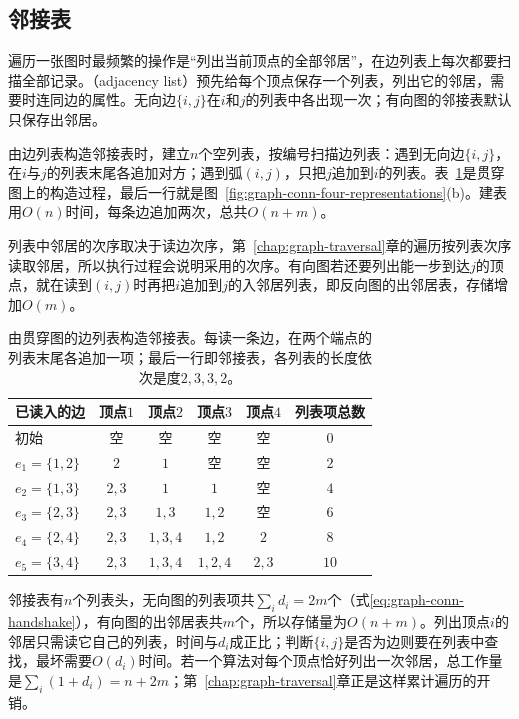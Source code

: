 \subsection{邻接表}
\label{sec:graph-conn-adjacency-list}

遍历一张图时最频繁的操作是“列出当前顶点的全部邻居”，在边列表上每次都要扫描全部记录。（adjacency list）预先给每个顶点保存一个列表，列出它的邻居，需要时连同边的属性。无向边$\{i,j\}$在$i$和$j$的列表中各出现一次；有向图的邻接表默认只保存出邻居。

由边列表构造邻接表时，建立$n$个空列表，按编号扫描边列表：遇到无向边$\{i,j\}$，在$i$与$j$的列表末尾各追加对方；遇到弧$(i,j)$，只把$j$追加到$i$的列表。表~\ref{tab:graph-conn-adjacency-list-trace}是贯穿图上的构造过程，最后一行就是图~\ref{fig:graph-conn-four-representations}(b)。建表用$O(n)$时间，每条边追加两次，总共$O(n+m)$。

列表中邻居的次序取决于读边次序，第~\ref{chap:graph-traversal}章的遍历按列表次序读取邻居，所以执行过程会说明采用的次序。有向图若还要列出能一步到达$j$的顶点，就在读到$(i,j)$时再把$i$追加到$j$的入邻居列表，即反向图的出邻居表，存储增加$O(m)$。

\begin{table}[!htb]
  \centering
  \small
  \begin{tabular}{@{}lccccc@{}}
    \toprule
    已读入的边 & 顶点$1$ & 顶点$2$ & 顶点$3$ & 顶点$4$ & 列表项总数\\
    \midrule
    初始 & 空 & 空 & 空 & 空 & $0$\\
    $e_1=\{1,2\}$ & $2$ & $1$ & 空 & 空 & $2$\\
    $e_2=\{1,3\}$ & $2,3$ & $1$ & $1$ & 空 & $4$\\
    $e_3=\{2,3\}$ & $2,3$ & $1,3$ & $1,2$ & 空 & $6$\\
    $e_4=\{2,4\}$ & $2,3$ & $1,3,4$ & $1,2$ & $2$ & $8$\\
    $e_5=\{3,4\}$ & $2,3$ & $1,3,4$ & $1,2,4$ & $2,3$ & $10$\\
    \bottomrule
  \end{tabular}
  \caption{由贯穿图的边列表构造邻接表。每读一条边，在两个端点的列表末尾各追加一项；最后一行即邻接表，各列表的长度依次是度$2,3,3,2$。}
  \label{tab:graph-conn-adjacency-list-trace}
\end{table}

邻接表有$n$个列表头，无向图的列表项共$\sum_i d_i=2m$个（式\eqref{eq:graph-conn-handshake}），有向图的出邻居表共$m$个，所以存储量为$O(n+m)$。列出顶点$i$的邻居只需读它自己的列表，时间与$d_i$成正比；判断$\{i,j\}$是否为边则要在列表中查找，最坏需要$O(d_i)$时间。若一个算法对每个顶点恰好列出一次邻居，总工作量是$\sum_i(1+d_i)=n+2m$；第~\ref{chap:graph-traversal}章正是这样累计遍历的开销。

